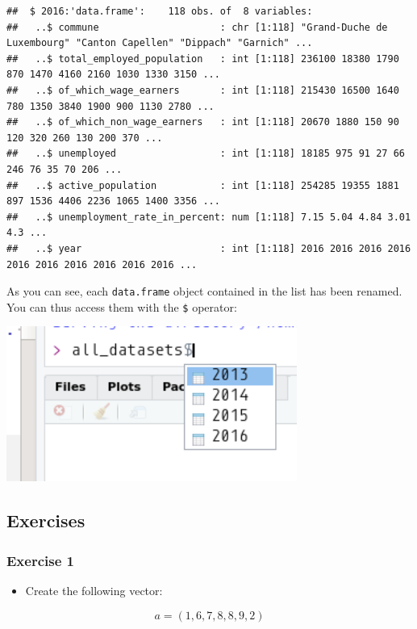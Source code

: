 \documentclass[]{gitbook}
\providecommand{\tightlist}{%
  \setlength{\itemsep}{0pt}\setlength{\parskip}{0pt}}
\theoremstyle{definition}
\theoremstyle{definition}
\theoremstyle{definition}
\theoremstyle{remark}
\begin{document}
\begin{verbatim}
##  $ 2016:'data.frame':    118 obs. of  8 variables:
##   ..$ commune                     : chr [1:118] "Grand-Duche de Luxembourg" "Canton Capellen" "Dippach" "Garnich" ...
##   ..$ total_employed_population   : int [1:118] 236100 18380 1790 870 1470 4160 2160 1030 1330 3150 ...
##   ..$ of_which_wage_earners       : int [1:118] 215430 16500 1640 780 1350 3840 1900 900 1130 2780 ...
##   ..$ of_which_non_wage_earners   : int [1:118] 20670 1880 150 90 120 320 260 130 200 370 ...
##   ..$ unemployed                  : int [1:118] 18185 975 91 27 66 246 76 35 70 206 ...
##   ..$ active_population           : int [1:118] 254285 19355 1881 897 1536 4406 2236 1065 1400 3356 ...
##   ..$ unemployment_rate_in_percent: num [1:118] 7.15 5.04 4.84 3.01 4.3 ...
##   ..$ year                        : int [1:118] 2016 2016 2016 2016 2016 2016 2016 2016 2016 2016 ...
\end{verbatim}

As you can see, each \texttt{data.frame} object contained in the list
has been renamed. You can thus access them with the \texttt{\$}
operator:

\includegraphics[width=3.75in]{pics/all_datasets_names}

\hypertarget{exercises-5}{%
\subsection{Exercises}\label{exercises-5}}

\hypertarget{exercise-1-5}{%
\subsubsection*{Exercise 1}\label{exercise-1-5}}

\begin{itemize}
\tightlist
\item
  Create the following vector:
\end{itemize}

\[a = (1,6,7,8,8,9,2)\]
\end{document}
